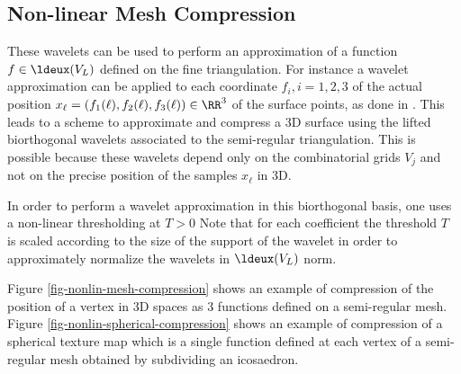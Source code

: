 \subsection{Non-linear Mesh Compression}

These wavelets can be used to perform an approximation of a function $f \in \ldeux(V_L)$ defined on the fine triangulation. For instance a wavelet approximation can be applied to each coordinate $f_i, i=1,2,3$ of the actual position $x_\ell = (f_1(\ell),f_2(\ell),f_3(\ell)) \in \RR^3$ of the surface points, as done in \cite{guskov-meshes-multires,khodakovsky-progressive-compression}. This leads to a scheme to approximate and compress a 3D surface using the lifted biorthogonal wavelets associated to the semi-regular triangulation. This is possible because these wavelets depend only on the combinatorial grids $V_j$ and not on the precise position of the samples $x_\ell$ in 3D. 

In order to perform a wavelet approximation in this biorthogonal basis, one uses a non-linear thresholding at $T>0$
Note that for each coefficient the threshold $T$ is scaled according to the size of the support of the wavelet in order to approximately normalize the wavelets in $\ldeux(V_L)$ norm.   

Figure \ref{fig-nonlin-mesh-compression} shows an example of compression of the position of a vertex in 3D spaces as 3 functions defined on a semi-regular mesh. Figure \ref{fig-nonlin-spherical-compression} shows an example of compression of a spherical texture map which is a single function defined at each vertex of a semi-regular mesh obtained by subdividing an icosaedron. 



